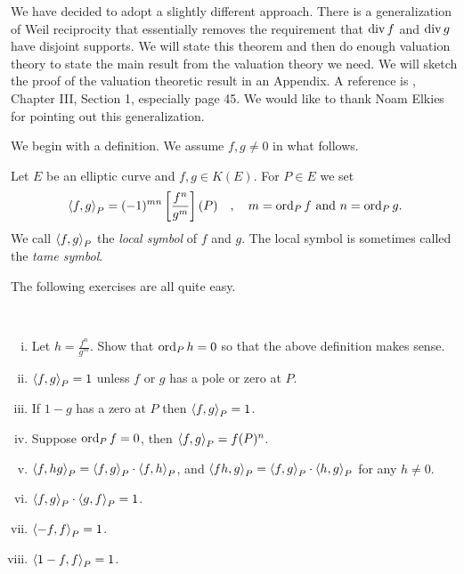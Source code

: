 We have decided to adopt a slightly different approach. There is a generalization of Weil reciprocity that essentially removes the requirement that $\operatorname{div} f$ and $\operatorname{div} g$ have disjoint supports. We will state this theorem and then do enough valuation theory to state the main result from the valuation theory we need. We will sketch the proof of the valuation theoretic result in an Appendix. A reference is \cite{r2.13}, Chapter III, Section 1, especially page 45. We would like to thank Noam Elkies for pointing out this generalization.

We begin with a definition. We assume $f, g\neq 0$ in what follows.

\begin{defi}
\label{d2.7.15}
Let $E$ be an elliptic curve and $f,g\in K(E)$. For $P\in E$ we set
$$
\left\langle f,g \right \rangle_{P}=(-1)^{mn}\left[\frac{f^{n}}{g^{m}}\right](P) \quad,\quad m=\operatorname{ord}_{P} f \text{  and }n=\operatorname{ord}_{P}g.
$$
We call $\left\langle f, g \right \rangle_{P}$ the {\it local symbol} of $f$ and $g$. The local symbol is sometimes called the {\it tame symbol}.
\end{defi}

The following exercises are all quite easy.

\begin{exo}
\label{e2.7.10}
~
\begin{enumerate}[(i)]
\item
Let $h=\displaystyle \frac{f^{n}}{g^{m}}$. Show that $\operatorname{ord}_{P}h=0$ so that the above definition makes sense.
\item
$\left\langle f,g \right \rangle_{P}=1$ unless $f$ or $g$ has a pole or zero at $P$.
\item
If $1-g$ has a zero at $P$ 
then $\left\langle f,g \right \rangle_{P}=1$.
\item
Suppose $\operatorname{ord}_{P}f=0$, then $\left\langle f,g \right \rangle_{P} = f(P)^{n}$.
\item
$\left\langle f,hg \right \rangle_{P}=\left\langle f,g \right \rangle_{P} \cdot \left\langle f,h \right \rangle_{P}$, and $\left\langle fh,g \right \rangle_{P}=\left\langle f,g \right \rangle_{P} \cdot \left\langle h,g \right \rangle_{P}$ for any $h\neq 0$.
\item
$\left\langle f,g \right \rangle_{P} \cdot \left\langle g,f \right \rangle_{P}=1$.
\item
$\left\langle -f,f \right \rangle_{P}=1$.
\item
$\left\langle 1-f,f \right \rangle_{P}=1$.
\end{enumerate}
\end{exo}

